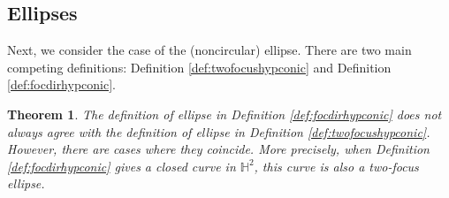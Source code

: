 \documentclass[12pt]{amsart}
\newtheorem{theorem}{Theorem}
\theoremstyle{definition}
\begin{document}
\subsection{Ellipses}
\label{sec:ellipse}

Next, we consider the case of the (noncircular) ellipse. There are two
main competing definitions: Definition \ref{def:twofocushypconic} and
Definition \ref{def:focdirhypconic}.
\begin{theorem}
\label{thm:twoellipses}
The definition of ellipse in Definition \ref{def:focdirhypconic} does
\emph{not always} agree with the definition of ellipse in Definition
\ref{def:twofocushypconic}.  However, there are cases where they
coincide. More precisely, when Definition \ref{def:focdirhypconic}
gives a closed curve in ${\mathbb H}^2$, this curve is also a two-focus ellipse.
\end{theorem}
\end{document}
